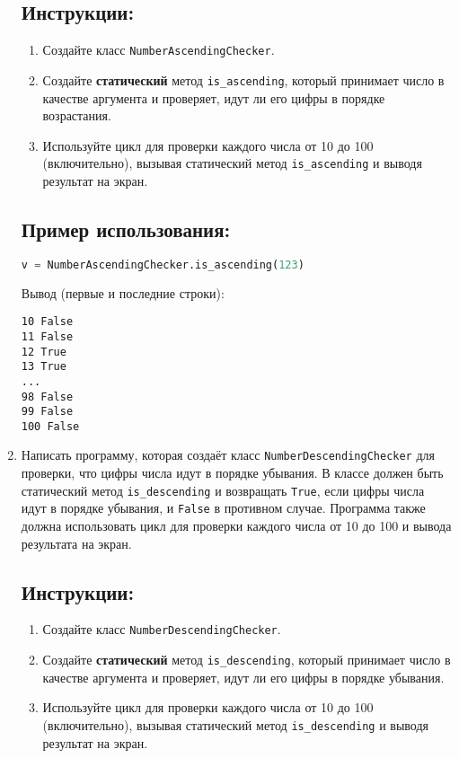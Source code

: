 \begin{enumerate}
\subsection*{Инструкции:}
\begin{enumerate}
    \item Создайте класс \texttt{NumberAscendingChecker}.
    \item Создайте \textbf{статический} метод \texttt{is\_ascending}, который принимает число в качестве аргумента и проверяет, идут ли его цифры в порядке возрастания.
    \item Используйте цикл для проверки каждого числа от 10 до 100 (включительно), вызывая статический метод \texttt{is\_ascending} и выводя результат на экран.
\end{enumerate}

\subsection*{Пример использования:}
\begin{lstlisting}[language=Python]
    v = NumberAscendingChecker.is_ascending(123)
\end{lstlisting}
Вывод (первые и последние строки):
\begin{verbatim}
10 False
11 False
12 True
13 True
...
98 False
99 False
100 False
\end{verbatim}

\item
Написать программу, которая создаёт класс \texttt{NumberDescendingChecker} 
для проверки, что цифры числа идут в порядке убывания. В классе должен быть статический метод
\texttt{is\_descending} и возвращать \texttt{True}, если цифры числа идут в порядке убывания, 
и \texttt{False} в противном случае. 
Программа также должна использовать цикл для проверки каждого числа от 
10 до 100 и вывода результата на экран.

\subsection*{Инструкции:}
\begin{enumerate}
    \item Создайте класс \texttt{NumberDescendingChecker}.
    \item Создайте \textbf{статический} метод \texttt{is\_descending}, который принимает число в качестве аргумента и проверяет, идут ли его цифры в порядке убывания.
    \item Используйте цикл для проверки каждого числа от 10 до 100 (включительно), вызывая статический метод \texttt{is\_descending} и выводя результат на экран.
\end{enumerate}


\end{enumerate}

